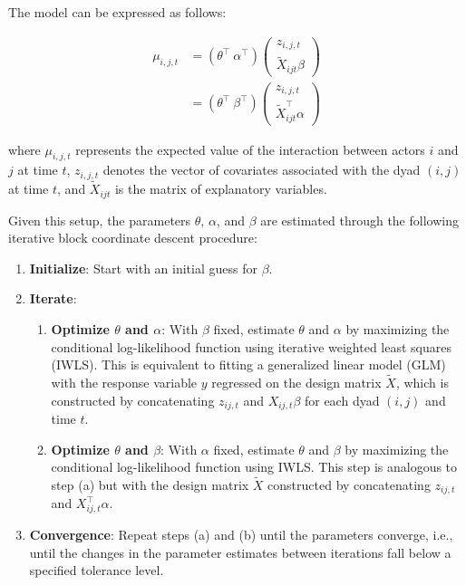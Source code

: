 The model can be expressed as follows:

\begin{align*}
	\mu_{i,j,t} & = ( \theta^{\top} \ \alpha^{\top} )
	\left ( \begin{array}{c} z_{i,j,t} \\ \tilde{X}_{ijt} \beta \end{array} \right ) \\
	 &= ( \theta^{\top} \ \beta^{\top} )
	\left ( \begin{array}{c} z_{i,j,t} \\ \tilde{X}_{ijt}^{\top} \alpha \end{array} \right )
\end{align*}

where $\mu_{i,j,t}$ represents the expected value of the interaction between actors $i$ and $j$ at time $t$, $z_{i,j,t}$ denotes the vector of covariates associated with the dyad $(i, j)$ at time $t$, and $\tilde{X}_{ijt}$ is the matrix of explanatory variables.

Given this setup, the parameters $\theta$, $\alpha$, and $\beta$ are estimated through the following iterative block coordinate descent procedure:

\begin{enumerate}
    \item \textbf{Initialize}: Start with an initial guess for $\beta$.
    \item \textbf{Iterate}: 
    \begin{enumerate}
        \item \textbf{Optimize $\theta$ and $\alpha$}: With $\beta$ fixed, estimate $\theta$ and $\alpha$ by maximizing the conditional log-likelihood function using iterative weighted least squares (IWLS). This is equivalent to fitting a generalized linear model (GLM) with the response variable $y$ regressed on the design matrix $\tilde{X}$, which is constructed by concatenating $z_{ij,t}$ and $X_{ij,t} \beta$ for each dyad $(i, j)$ and time $t$.
        \item \textbf{Optimize $\theta$ and $\beta$}: With $\alpha$ fixed, estimate $\theta$ and $\beta$ by maximizing the conditional log-likelihood function using IWLS. This step is analogous to step (a) but with the design matrix $\tilde{X}$ constructed by concatenating $z_{ij,t}$ and $X_{ij,t}^{\top} \alpha$.
    \end{enumerate}
    \item \textbf{Convergence}: Repeat steps (a) and (b) until the parameters converge, i.e., until the changes in the parameter estimates between iterations fall below a specified tolerance level.
\end{enumerate}

